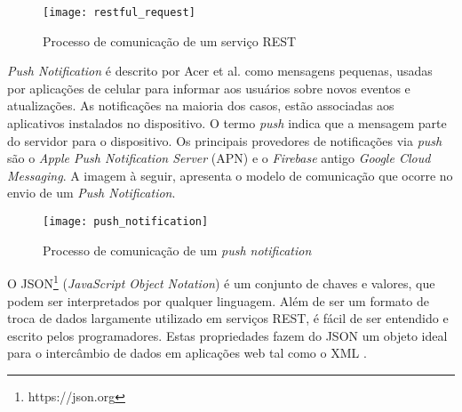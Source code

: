 \begin{figure}[h]
	\texttt{[image: restful\_request]}
	\centering
	\caption{Processo de comunicação de um serviço REST}
\end{figure}

\textit{Push Notification} é descrito por Acer et al. \cite{Acer:2015:EES:2902314.2902344} como mensagens pequenas, usadas por aplicações de celular para informar aos usuários sobre novos eventos e atualizações. As notificações na maioria dos casos, estão associadas aos aplicativos instalados no dispositivo. O termo \textit{push} indica que a mensagem parte do servidor para o dispositivo. Os principais provedores de notificações via \textit{push} são o \textit{Apple Push Notification Server} (APN) e o \textit{Firebase} antigo \textit{Google Cloud Messaging}. A imagem à seguir, apresenta o modelo de comunicação que ocorre no envio de um \textit{Push Notification}.\par

\begin{figure}[h]
	\texttt{[image: push\_notification]}
	\centering
	\caption{Processo de comunicação de um \textit{push notification}}
\end{figure}

O JSON\footnote{https://json.org} (\textit{JavaScript Object Notation}) é um conjunto de chaves e valores, que podem
ser interpretados por qualquer linguagem. Além de ser um formato de troca de dados largamente utilizado em serviços REST, é fácil de ser entendido e escrito pelos programadores. Estas propriedades fazem do JSON um objeto ideal para o intercâmbio de dados em aplicações web tal como o XML \cite{jun_y_zhishu}.